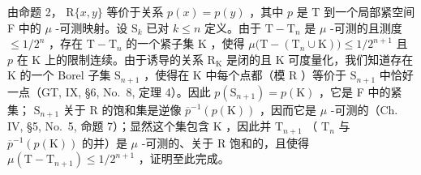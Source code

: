 由命题 2， \(\mathrm{R}\{x,y\}\) 等价于关系 \(p(x)=p(y)\) ，其中 \(p\) 是 T 到一个局部紧空间 F 中的 \(\mu\) -可测映射。设 \(\mathrm{S}_{k}\) 已对 \(k\leqslant n\) 定义。由于 \(\mathrm{T}-\mathrm{T}_{n}\) 是 \(\mu\) -可测的且测度 \(\leqslant 1/2^{n}\) ，存在 \(\mathrm{T}-\mathrm{T}_{n}\) 的一个紧子集 K ，使得 \(\mu\big(\mathrm{T}-(\mathrm{T}_{n}\cup\mathrm{K})\big)\leqslant 1/2^{n+1}\) 且 \(p\) 在 K 上的限制连续。由于诱导的关系 \(\mathrm{R}_{\mathrm{K}}\) 是闭的且 K 可度量化，我们知道存在 K 的一个 Borel 子集 \(\mathrm{S}_{n+1}\) ，使得在 K 中每个点都（模 R ）等价于 \(\mathrm{S}_{n+1}\) 中恰好一点（GT, IX, §6, No.~8, 定理 4）。因此 \(p(\mathrm{S}_{n+1})=p(\mathrm{K})\) ，它是 F 中的紧集； \(\mathrm{S}_{n+1}\) 关于 R 的饱和集是逆像 \(\overline{p}^{-1}(p(\mathrm{K}))\) ，因而它是 \(\mu\) -可测的（Ch. IV, §5, No.~5, 命题 7）；显然这个集包含 K ，因此并 \(\mathrm{T}_{n+1}\) （ \(\mathrm{T}_n\) 与 \(\overline{p}^{-1}(p(\mathrm{K}))\) 的并）是 \(\mu\) -可测的、关于 R 饱和的，且使得 \(\mu(\mathrm{T} - \mathrm{T}_{n+1}) \leqslant 1/2^{n+1}\) ，证明至此完成。

